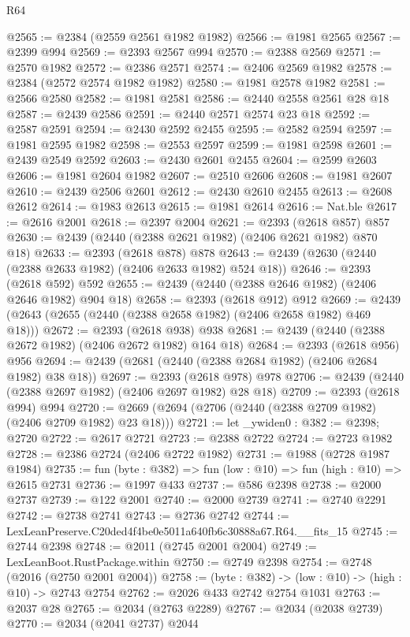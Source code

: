 \begin{lexlean}{R64}
\begin{coremodule}
@2565 := @2384 (@2559 @2561 @1982 @1982)
@2566 := @1981 @2565
@2567 := @2399 @994
@2569 := @2393 @2567 @994
@2570 := @2388 @2569
@2571 := @2570 @1982
@2572 := @2386 @2571
@2574 := @2406 @2569 @1982
@2578 := @2384 (@2572 @2574 @1982 @1982)
@2580 := @1981 @2578 @1982
@2581 := @2566 @2580
@2582 := @1981 @2581
@2586 := @2440 @2558 @2561 @28 @18
@2587 := @2439 @2586
@2591 := @2440 @2571 @2574 @23 @18
@2592 := @2587 @2591
@2594 := @2430 @2592 @2455
@2595 := @2582 @2594
@2597 := @1981 @2595 @1982
@2598 := @2553 @2597
@2599 := @1981 @2598
@2601 := @2439 @2549 @2592
@2603 := @2430 @2601 @2455
@2604 := @2599 @2603
@2606 := @1981 @2604 @1982
@2607 := @2510 @2606
@2608 := @1981 @2607
@2610 := @2439 @2506 @2601
@2612 := @2430 @2610 @2455
@2613 := @2608 @2612
@2614 := @1983 @2613
@2615 := @1981 @2614
@2616 := Nat.ble
@2617 := @2616 @2001
@2618 := @2397 @2004
@2621 := @2393 (@2618 @857) @857
@2630 := @2439 (@2440 (@2388 @2621 @1982) (@2406 @2621 @1982) @870 @18)
@2633 := @2393 (@2618 @878) @878
@2643 := @2439 (@2630 (@2440 (@2388 @2633 @1982) (@2406 @2633 @1982) @524 @18))
@2646 := @2393 (@2618 @592) @592
@2655 := @2439 (@2440 (@2388 @2646 @1982) (@2406 @2646 @1982) @904 @18)
@2658 := @2393 (@2618 @912) @912
@2669 := @2439 (@2643 (@2655 (@2440 (@2388 @2658 @1982) (@2406 @2658 @1982) @469 @18)))
@2672 := @2393 (@2618 @938) @938
@2681 := @2439 (@2440 (@2388 @2672 @1982) (@2406 @2672 @1982) @164 @18)
@2684 := @2393 (@2618 @956) @956
@2694 := @2439 (@2681 (@2440 (@2388 @2684 @1982) (@2406 @2684 @1982) @38 @18))
@2697 := @2393 (@2618 @978) @978
@2706 := @2439 (@2440 (@2388 @2697 @1982) (@2406 @2697 @1982) @28 @18)
@2709 := @2393 (@2618 @994) @994
@2720 := @2669 (@2694 (@2706 (@2440 (@2388 @2709 @1982) (@2406 @2709 @1982) @23 @18)))
@2721 := let _ywiden0 : @382 := @2398; @2720
@2722 := @2617 @2721
@2723 := @2388 @2722
@2724 := @2723 @1982
@2728 := @2386 @2724 (@2406 @2722 @1982)
@2731 := @1988 (@2728 @1987 @1984)
@2735 := fun (byte : @382) => fun (low : @10) => fun (high : @10) => @2615 @2731
@2736 := @1997 @433
@2737 := @586 @2398
@2738 := @2000 @2737
@2739 := @122 @2001
@2740 := @2000 @2739
@2741 := @2740 @2291
@2742 := @2738 @2741
@2743 := @2736 @2742
@2744 := LexLeanPreserve.C20ded4f4be0e5011a640fb6c30888a67.R64.__fits_15
@2745 := @2744 @2398
@2748 := @2011 (@2745 @2001 @2004)
@2749 := LexLeanBoot.RustPackage.within
@2750 := @2749 @2398
@2754 := @2748 (@2016 (@2750 @2001 @2004))
@2758 := (byte : @382) -> (low : @10) -> (high : @10) -> @2743 @2754
@2762 := @2026 @433 @2742 @2754 @1031
@2763 := @2037 @28
@2765 := @2034 (@2763 @2289)
@2767 := @2034 (@2038 @2739)
@2770 := @2034 (@2041 @2737) @2044

\end{coremodule}
\end{lexlean}
